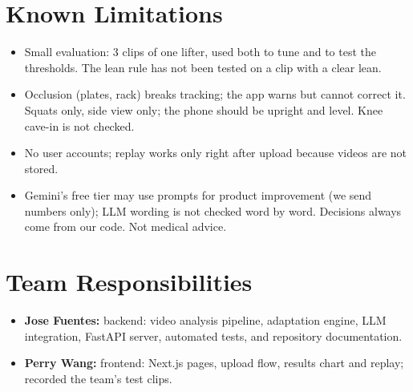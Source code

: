 \documentclass[11pt]{article}
\begin{document}
\section{Known Limitations}
\begin{itemize}
  \item Small evaluation: 3 clips of one lifter, used both to tune and to test the thresholds. The lean rule has not been tested on a clip with a clear lean.
  \item Occlusion (plates, rack) breaks tracking; the app warns but cannot correct it. Squats only, side view only; the phone should be upright and level. Knee cave-in is not checked.
  \item No user accounts; replay works only right after upload because videos are not stored.
  \item Gemini's free tier may use prompts for product improvement (we send numbers only); LLM wording is not checked word by word. Decisions always come from our code. Not medical advice.
\end{itemize}

\section{Team Responsibilities}
\begin{itemize}
  \item \textbf{Jose Fuentes:} backend: video analysis pipeline, adaptation engine, LLM integration, FastAPI server, automated tests, and repository documentation.
  \item \textbf{Perry Wang:} frontend: Next.js pages, upload flow, results chart and replay; recorded the team's test clips.
\end{itemize}
\end{document}
